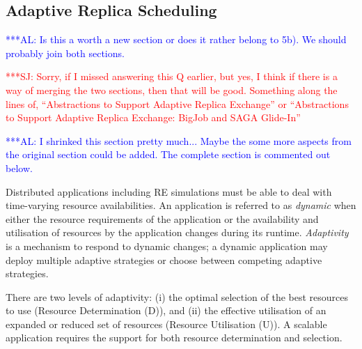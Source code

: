\documentclass{rspublic}
\newcommand{\alnote}[1]{ {\textcolor{blue} { ***AL: #1 }}}
\newcommand{\jhanote}[1]{ {\textcolor{red} { ***SJ: #1 }}}
\newcommand{\alnote}[1]{}
\newcommand{\jhanote}[1]{}
\newcommand{\glidein}[1]{Glide-In }
\begin{document}

   
\subsection{Adaptive Replica Scheduling}
\label{sec:adaptivitiy}    
\alnote{Is this a worth a new section or does it rather belong to
  5b). We should probably join both sections.}  

\jhanote{Sorry, if I missed answering this Q earlier, but yes, I think
  if there is a way of merging the two sections, then that will be
  good. Something along the lines of, ``Abstractions to Support
  Adaptive Replica Exchange'' or ``Abstractions to Support Adaptive
  Replica Exchange: BigJob and SAGA Glide-In''}

\alnote{I shrinked this section pretty much... Maybe the some more
    aspects from the original section could be added. The complete
    section is commented out below.}

Distributed applications including RE simulations must be able to 
deal with time-varying resource availabilities.
An application is referred to as \emph{dynamic} when either the
resource requirements of the application or the availability and
utilisation of resources by the application changes during its
runtime.  \emph{Adaptivity} is a mechanism to respond to dynamic
changes; %
a dynamic application may deploy multiple adaptive strategies or
choose between competing adaptive strategies.

There are two levels of adaptivity: (i) the optimal selection of 
the best resources to use (Resource Determination (D)), and 
(ii) the effective utilisation of an expanded or reduced set
of resources (Resource Utilisation (U)).
A scalable application requires the support for both
resource determination and selection. 
\end{document}
